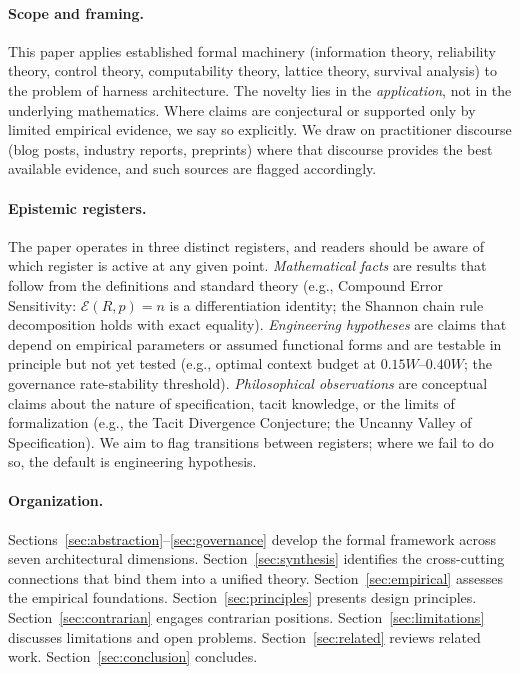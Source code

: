 \documentclass[11pt, a4paper, logo, copyright]{googledeepmind}
\begin{document}
\paragraph{Scope and framing.} This paper applies established formal machinery (information theory, reliability theory, control theory, computability theory, lattice theory, survival analysis) to the problem of harness architecture. The novelty lies in the \emph{application}, not in the underlying mathematics. Where claims are conjectural or supported only by limited empirical evidence, we say so explicitly. We draw on practitioner discourse (blog posts, industry reports, preprints) where that discourse provides the best available evidence, and such sources are flagged accordingly.

\paragraph{Epistemic registers.} The paper operates in three distinct registers, and readers should be aware of which register is active at any given point. \emph{Mathematical facts} are results that follow from the definitions and standard theory (e.g., Compound Error Sensitivity: $\mathcal{E}(R,p) = n$ is a differentiation identity; the Shannon chain rule decomposition holds with exact equality). \emph{Engineering hypotheses} are claims that depend on empirical parameters or assumed functional forms and are testable in principle but not yet tested (e.g., optimal context budget at $0.15W$--$0.40W$; the governance rate-stability threshold). \emph{Philosophical observations} are conceptual claims about the nature of specification, tacit knowledge, or the limits of formalization (e.g., the Tacit Divergence Conjecture; the Uncanny Valley of Specification). We aim to flag transitions between registers; where we fail to do so, the default is engineering hypothesis.

\paragraph{Organization.} Sections~\ref{sec:abstraction}--\ref{sec:governance} develop the formal framework across seven architectural dimensions. Section~\ref{sec:synthesis} identifies the cross-cutting connections that bind them into a unified theory. Section~\ref{sec:empirical} assesses the empirical foundations. Section~\ref{sec:principles} presents design principles. Section~\ref{sec:contrarian} engages contrarian positions. Section~\ref{sec:limitations} discusses limitations and open problems. Section~\ref{sec:related} reviews related work. Section~\ref{sec:conclusion} concludes.
\end{document}
